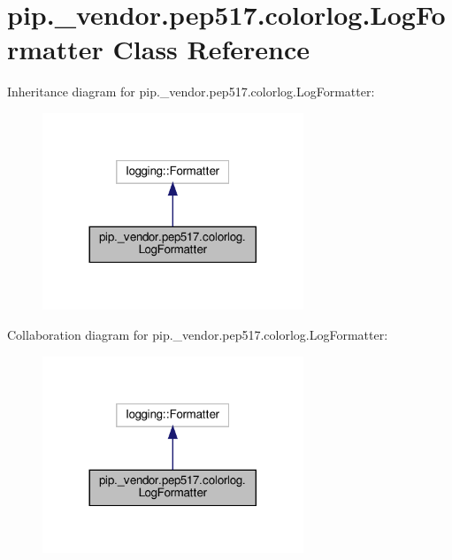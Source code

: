 \hypertarget{classpip_1_1__vendor_1_1pep517_1_1colorlog_1_1LogFormatter}{}\section{pip.\+\_\+vendor.\+pep517.\+colorlog.\+Log\+Formatter Class Reference}
\label{classpip_1_1__vendor_1_1pep517_1_1colorlog_1_1LogFormatter}


Inheritance diagram for pip.\+\_\+vendor.\+pep517.\+colorlog.\+Log\+Formatter\+:
\nopagebreak
\begin{figure}[H]
\begin{center}
\leavevmode
\includegraphics[width=221pt]{classpip_1_1__vendor_1_1pep517_1_1colorlog_1_1LogFormatter__inherit__graph}
\end{center}
\end{figure}


Collaboration diagram for pip.\+\_\+vendor.\+pep517.\+colorlog.\+Log\+Formatter\+:
\nopagebreak
\begin{figure}[H]
\begin{center}
\leavevmode
\includegraphics[width=221pt]{classpip_1_1__vendor_1_1pep517_1_1colorlog_1_1LogFormatter__coll__graph}
\end{center}
\end{figure}
